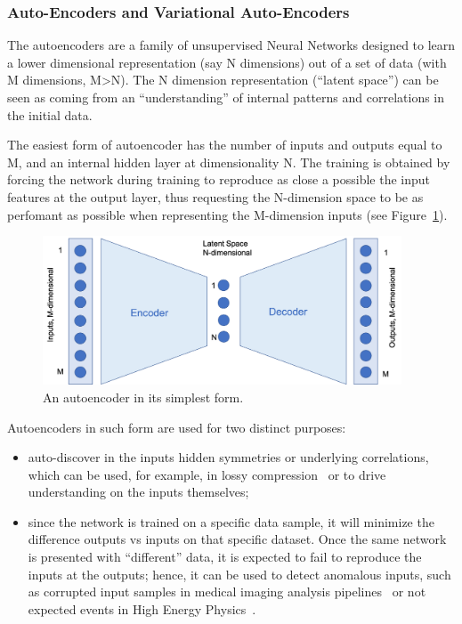 \subsubsection{Auto-Encoders and Variational Auto-Encoders}
\label{sec:unsupervised}
The autoencoders are a family of unsupervised Neural Networks designed to learn a lower dimensional representation (say N dimensions) out of a set of data (with M dimensions, M\textgreater N). The N dimension representation (``latent space'') can be seen as coming from an ``understanding'' of internal patterns and correlations in the initial data.

The easiest form of autoencoder has the number of inputs and outputs equal to M, and an internal hidden layer at dimensionality N. The training is obtained by forcing the network during training to reproduce as close a possible the input features at the output layer, thus requesting the N-dimension space to be as perfomant as possible when representing the M-dimension inputs (see Figure~\ref{fig:autoencoder}).

\begin{figure}[htb]
     \centering
     \includegraphics[width=0.95\textwidth]{images/autoencoder.png}
     \caption{An autoencoder in its simplest form.}
     \label{fig:autoencoder}
 \end{figure}
 
 Autoencoders in such form are used for two distinct purposes:
 \begin{itemize}
     \item auto-discover in the inputs hidden symmetries or underlying correlations, which can be used, for example, in lossy compression~\cite{Liu2021} or to drive understanding on the inputs themselves; %
     \item since the network is trained on a specific data sample, it will minimize the difference outputs vs inputs on that specific dataset. Once the same network is presented with ``different'' data, it is expected to fail to reproduce the inputs at the outputs; hence, it can be used to detect anomalous inputs, such as corrupted input samples in medical imaging analysis pipelines~\cite{Ferrari2020} or not expected events in High Energy Physics~\cite{Knapp2021}. 
 \end{itemize}
 
